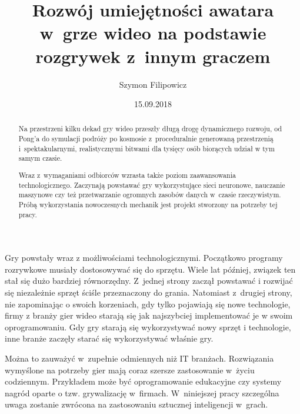 \documentclass[brudnopis]{xmgr}
\author {Szymon Filipowicz}
\title {Rozwój umiejętności awatara w~grze wideo na
podstawie rozgrywek z~innym graczem}
\date {15.09.2018}
\begin{document}
\begin{abstract}
Na przestrzeni kilku dekad gry wideo przeszły długą drogę dynamicznego rozwoju, od Pong'a do symulacji podróży po
kosmosie z~proceduralnie generowaną przestrzenią i~spektakularnymi, realistycznymi
bitwami dla tysięcy osób biorących udział w tym samym czasie. 

Wraz z~wymaganiami odbiorców wzrasta także poziom zaawansowania technologicznego. Zaczynają powstawać gry wykorzystujące sieci neuronowe, nauczanie maszynowe czy też przetwarzanie ogromnych zasobów danych w~czasie rzeczywistym. Próbą wykorzystania nowoczesnych mechanik jest projekt stworzony na potrzeby tej pracy.
\end{abstract}
\maketitle
\introduction

Gry powstały wraz z możliwościami technologicznymi. Początkowo programy rozrywkowe musiały dostosowywać się do sprzętu. Wiele lat później, związek ten stał się dużo bardziej równorzędny. Z~jednej strony zaczął powstawać i rozwijać się niezależnie sprzęt ściśle przeznaczony do grania. Natomiast z~drugiej strony, nie zapominając o swoich korzeniach, gdy tylko pojawiają się nowe technologie, firmy z branży gier wideo starają się jak najszybciej implementować je w swoim oprogramowaniu. Gdy gry starają się wykorzystywać nowy sprzęt i technologie, inne branże zaczęły starać się wykorzystywać właśnie gry.

Można to zauważyć w~zupełnie odmiennych niż IT branżach. Rozwiązania wymyślone na potrzeby gier mają coraz szersze zastosowanie w~życiu codziennym. Przykładem może być oprogramowanie edukacyjne czy systemy nagród oparte o tzw. grywalizację w~firmach. W~niniejszej pracy szczególna
uwaga zostanie zwrócona na zastosowaniu sztucznej inteligencji w~grach.
\end{document}
